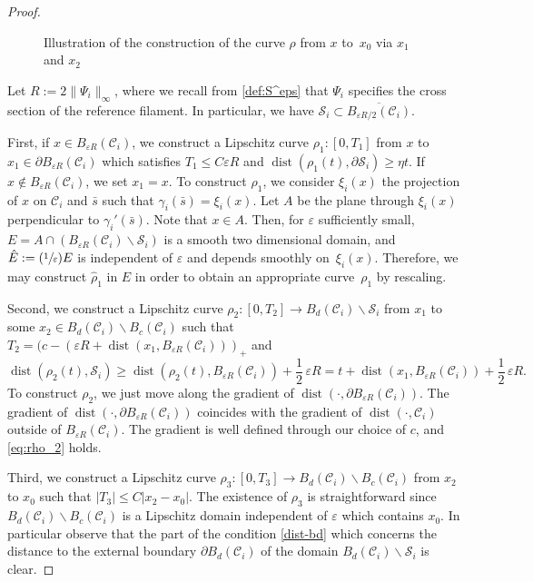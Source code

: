 \documentclass[10pt]{amsart}
\newcommand{\Psfrac}[2]{(\sfrac{#1}{#2})}
\let\eps\varepsilon
\DeclareMathOperator{\dist}{dist}
\theoremstyle{definition}
\theoremstyle{remark}
\begin{document}
\begin{proof}
\begin{figure}
\begin{tikzpicture}[scale=.9]
\end{tikzpicture}

\caption{\label{fig:John}Illustration of the construction of the curve $\rho$ from $x$ to~$x_0$ via $x_1$ and $x_2$}
\end{figure}

Let $R := 2 \|\Psi_i\|_\infty$, where we recall from \eqref{def:S^eps} that $\Psi_i$ specifies the cross section of the reference filament. In particular, we have $\mathcal S_i \subset \overline{B_{\eps R/2}(\mathcal C_i)}$.

First, if $x \in B_{\eps R}(\mathcal C_i)$, we construct a Lipschitz curve $\rho_1 \colon [0, T_1]$ from $x$ to $x_1 \in \partial B_{\eps R}(\mathcal C_i)$ which satisfies $T_1 \leq C \eps R$ and $\dist(\rho_1(t),\partial \mathcal S_i) \geq \eta t$.
If $x \not \in B_{\eps R}(\mathcal C_i)$, we set $x_1 = x$. To construct $\rho_1$, we consider $\xi_i(x)$ the projection of $x$ on $\mathcal C_i$ and $\bar s$ such that $\gamma_i (\bar s) = \xi_i (x)$. Let $A$ be the plane through $\xi_i(x)$ perpendicular to $\gamma_i'(\bar s)$. Note that $x \in A$.
Then, for $\eps$ sufficiently small, $E = A \cap (B_{\eps R}(\mathcal C_i) \smallsetminus \mathcal S_i)$ is a smooth two dimensional domain, and $\hat E := \Psfrac 1 \eps E$ is independent of $\eps$ and depends smoothly on~$\xi_i(x)$. Therefore, we may construct $\hat \rho_1$ in $\hat E$ in order to obtain an appropriate curve~$\rho_1$ by rescaling.

Second, we construct a Lipschitz curve $\rho_2 \colon [0,T_2] \to B_d(\mathcal
C_i) \smallsetminus \mathcal S_i$ from $x_1$ to some $x_2 \in B_d(\mathcal C_i) \smallsetminus B_c(\mathcal C_i)$
such that $T_2 = (c - (\eps R + \dist(x_1, B_{\eps R}(\mathcal C_i)))_+$ and
\begin{equation} \label{eq:rho_2}
\dist(\rho_2(t), \mathcal S_i) \geq \dist(\rho_2(t), B_{\eps R}(\mathcal C_i)) + \frac 1 2\, \eps R = t + \dist(x_1, B_{\eps R}(\mathcal C_i)) + \frac 1 2\, \eps R.
\end{equation}
To construct $\rho_2$, we just move along the gradient of $\dist(\cdot,\partial B_{\eps R}(\mathcal C_i))$. The gradient
of $\dist(\cdot,\partial B_{\eps R}(\mathcal C_i))$ coincides with the gradient of $\dist(\cdot,\mathcal C_i)$ outside of $B_{\eps R}(\mathcal C_i)$. The gradient is well defined through our choice of $c$, and \eqref{eq:rho_2} holds.

Third, we construct a Lipschitz curve $\rho_3 \colon [0,T_3] \to B_d(\mathcal C_i) \smallsetminus B_c(\mathcal C_i)$ from $x_2$ to $x_0$
such that $|T_3|\leq C|x_2 - x_0|$.
The existence of $\rho_3$ is straightforward since $B_d(\mathcal C_i) \smallsetminus B_c(\mathcal C_i)$ is a Lipschitz domain independent of $\eps$ which contains $x_0$.
In particular observe that the part of the condition \eqref{dist-bd} which concerns the distance to the external boundary $\partial B_d(\mathcal C_i) $ of the domain
$B_d(\mathcal C_i) \smallsetminus \mathcal S_i$ is clear.


\end{proof}
\end{document}
